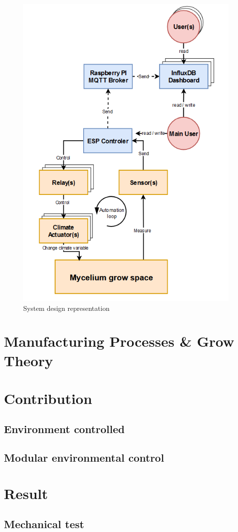 \begin{figure}[h]
    \centering
    \includegraphics{images/diagMyceliummachine.png}
    \caption{System design representation}
    \label{fig:blasttrash}
\end{figure} 


\section{Manufacturing Processes \& Grow Theory}

\section{Contribution}

\subsection{Environment controlled}
\subsection{Modular environmental control}



\section{Result}
\subsection{Mechanical test}






